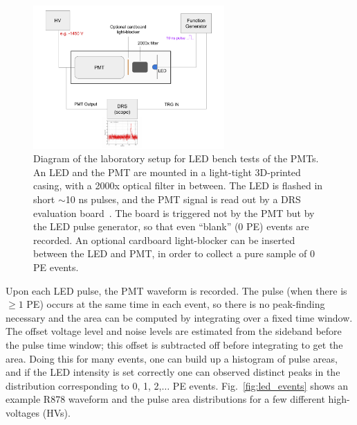 {\begin{figure}[t]
  \begin{center}
    \includegraphics[width=0.650\textwidth]{figs/milliq/pmt_setup.pdf}
    \caption{Diagram of the laboratory setup for LED bench tests of the PMTs.
      An LED and the PMT are mounted in a light-tight 3D-printed casing,
      with a 2000x optical filter in between. The LED is flashed in
      short $\sim$10 ns pulses, and the PMT signal is read out by
      a DRS evaluation board~\cite{drs}. The board is triggered not by the 
      PMT but by the LED pulse generator, so that even ``blank'' (0 PE) events
      are recorded. An optional cardboard light-blocker can be inserted between
      the LED and PMT, in order to collect a pure sample of 0 PE events.
            }
    \label{fig:pmt_setup}
  \end{center}
\end{figure}

Upon each LED pulse, the PMT waveform is recorded. The pulse (when there is $\geq1$ PE)
occurs at the same time in each event, so there is no peak-finding necessary and the 
area can be computed by integrating over a fixed time window. The offset voltage level
and noise levels are estimated from the sideband before the pulse time window; this offset
is subtracted off before integrating to get the area. Doing this for many
events, one can build up a histogram of pulse areas, and if the LED intensity is
set correctly one can observed distinct peaks in the distribution corresponding
to 0, 1, 2,$\dots$ PE events. Fig.~\ref{fig:led_events} shows an example
R878 waveform and the pulse area distributions for a few different 
high-voltages (HVs).

}
